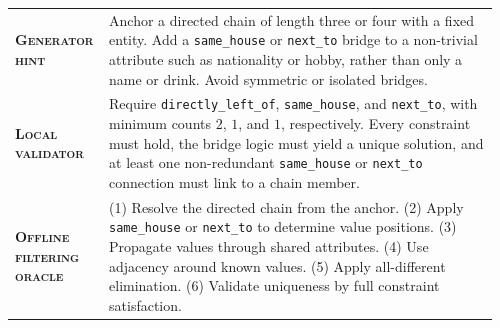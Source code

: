 \begin{table}[htbp]
\centering
\begin{minipage}{0.97\textwidth}
\raggedright
\small
\setlength{\tabcolsep}{3pt}
\renewcommand{\arraystretch}{1.16}
\vspace{0.35em}
\begin{tabular}{@{}>{\raggedright\arraybackslash\bfseries}p{0.17\linewidth} >{\raggedright\arraybackslash}p{0.79\linewidth}@{}}
    \textsc{Generator hint} & Anchor a directed chain of length three or four with a fixed entity. Add a \texttt{same\_house} or \texttt{next\_to} bridge to a non-trivial attribute such as nationality or hobby, rather than only a name or drink. Avoid symmetric or isolated bridges. \\
    \textsc{Local validator} & Require \texttt{directly\_left\_of}, \texttt{same\_house}, and \texttt{next\_to}, with minimum counts $2$, $1$, and $1$, respectively. Every constraint must hold, the bridge logic must yield a unique solution, and at least one non-redundant \texttt{same\_house} or \texttt{next\_to} connection must link to a chain member. \\
    \textsc{Offline filtering oracle} & (1) Resolve the directed chain from the anchor. (2) Apply \texttt{same\_house} or \texttt{next\_to} to determine value positions. (3) Propagate values through shared attributes. (4) Use adjacency around known values. (5) Apply all-different elimination. (6) Validate uniqueness by full constraint satisfaction. \\
\end{tabular}
\vspace{0.45em}
\end{minipage}
\end{table}

